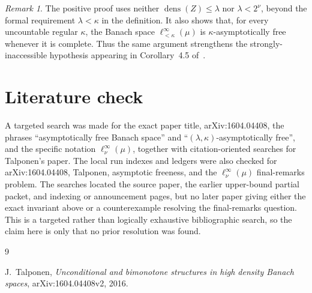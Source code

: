 \documentclass[11pt]{article}
\theoremstyle{remark}
\newtheorem{remark}[theorem]{Remark}
\newcommand{\dens}{\operatorname{dens}}
\begin{document}
\begin{remark}
The positive proof uses neither \(\dens(Z)\leq\lambda\) nor
\(\lambda<2^\nu\), beyond the formal requirement \(\lambda<\kappa\) in
the definition.  It also shows that, for every uncountable regular
\(\kappa\), the Banach space \(\ell_{<\kappa}^\infty(\mu)\) is
\(\kappa\)-asymptotically free whenever it is complete.  Thus the same
argument strengthens the strongly-inaccessible hypothesis appearing in
Corollary~4.5 of~\cite{Talponen}.
\end{remark}

\section{Literature check}

A targeted search was made for the exact paper title, arXiv:1604.04408,
the phrases ``asymptotically free Banach space'' and
``\((\lambda,\kappa)\)-asymptotically free'', and the specific notation
\(\ell_\nu^\infty(\mu)\), together with citation-oriented searches for
Talponen's paper.  The local run indexes and ledgers were also checked for
arXiv:1604.04408, Talponen, asymptotic freeness, and the
\(\ell_\nu^\infty(\mu)\) final-remarks problem.  The searches located the
source paper, the earlier upper-bound partial packet, and indexing or
announcement pages, but no later paper giving either the exact invariant above
or a counterexample resolving the final-remarks question.  This is a targeted
rather than logically exhaustive bibliographic search, so the claim here is
only that no prior resolution was found.

\begin{thebibliography}{9}

J.~Talponen,
\emph{Unconditional and bimonotone structures in high density Banach spaces},
arXiv:1604.04408v2, 2016.

\end{thebibliography}
\end{document}

